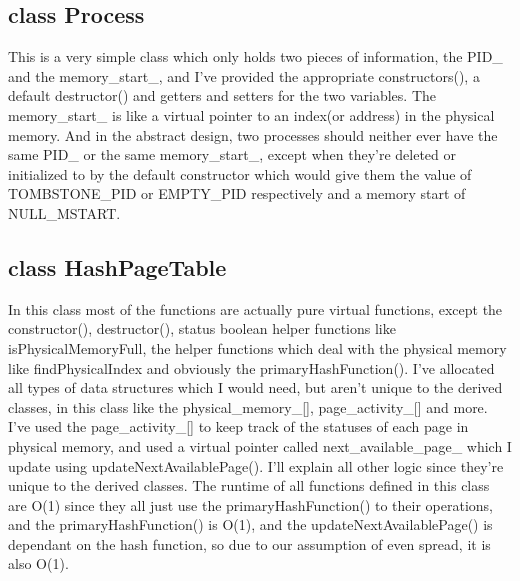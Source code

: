 \documentclass[a4paper]{article}
\begin{document}
    \subsection{{\color{orange}class} {\color{draculapurple}Process}}
    This is a very simple class which only holds two pieces of information, the {\color{Turquoise}PID\_} and the
        {\color{Turquoise}memory\_start\_}, and I've provided the appropriate {\color{draculapurple}constructors()}, a
        {\color{draculapurple}default destructor()} and getters and setters for the two variables. The {\color{Turquoise}memory\_start\_} is
    like a virtual pointer to an index(or address) in the physical memory. And in the abstract design,
    two processes should neither ever have the same {\color{Turquoise}PID\_} or the same {\color{Turquoise}memory\_start\_},
    except when they're deleted or initialized to by the default constructor which would give them the value of
        {\color{LimeGreen}TOMBSTONE\_PID} or {\color{LimeGreen}EMPTY\_PID} respectively and a memory start of
        {\color{LimeGreen}NULL\_MSTART}.

    \subsection{{\color{orange}class} {\color{draculapurple}HashPageTable}}
    In this class most of the functions are actually pure virtual functions, except the {\color{draculapurple}constructor()}, {\color{draculapurple}destructor()},
    status boolean helper functions like {\color{draculapurple}isPhysicalMemoryFull}, the helper functions which deal with the
    physical memory like {\color{draculapurple}findPhysicalIndex{}} and obviously the {\color{draculapurple}primaryHashFunction()}.
    I've allocated all types of data structures which I would need, but aren't unique to the derived classes, in this class like the
        {\color{Turquoise}physical\_memory\_[]}, {\color{Turquoise}page\_activity\_[]} and more. I've used the {\color{Turquoise}page\_activity\_[]}
    to keep track of the statuses of each page in physical memory, and used a virtual pointer called {\color{Turquoise}next\_available\_page\_} which I update using {\color{draculapurple}updateNextAvailablePage()}.
    I'll explain all other logic since they're unique to the derived classes. The runtime of all functions defined in this class are {\color{lightblue}O(1)} since they all just use the
        {\color{draculapurple}primaryHashFunction()} to their operations, and the {\color{draculapurple}primaryHashFunction()} is {\color{lightblue}O(1)},
    and the {\color{draculapurple}updateNextAvailablePage()} is dependant on the hash function, so due to our assumption of even spread, it is also {\color{lightblue}O(1)}.
\end{document}
